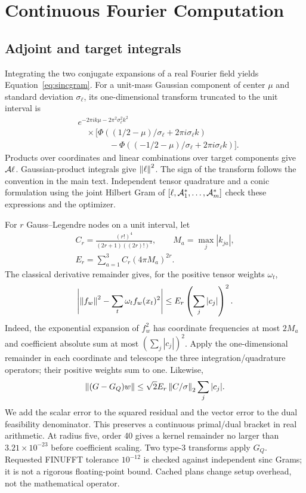 \section{Continuous Fourier Computation}\label{app:continuous}
\subsection{Adjoint and target integrals}
Integrating the two conjugate expansions of a real Fourier field yields
Equation~\eqref{eq:sincgram}. For a unit-mass Gaussian component of center
$\mu$ and standard deviation $\sigma_\ell$, its one-dimensional transform
truncated to the unit interval is
\begin{align}
&e^{-2\pi i k\mu-2\pi^2\sigma_\ell^2k^2}\nonumber\\
&\quad\times[\Phi((1/2-\mu)/\sigma_\ell+2\pi i\sigma_\ell k)\nonumber\\
&\hspace{45pt}-\Phi((-1/2-\mu)/\sigma_\ell+2\pi i\sigma_\ell k)].
\end{align}
Products over coordinates and linear combinations over target components
give $\mathcal A\ell$. Gaussian-product integrals give $\left\|\ell\right\|^2$. The sign
of the transform follows the convention in the main text. Independent
tensor quadrature and a conic formulation using the joint Hilbert Gram of
$[\ell,\mathcal A_1^*,\ldots,\mathcal A_m^*]$ check these expressions and the optimizer.

For $r$ Gauss--Legendre nodes on a unit interval, let
\[
\begin{gathered}
C_r=\frac{(r!)^4}{(2r+1)((2r)!)^3},\qquad M_a=\max_j|k_{ja}|,\\
E_r=\sum_{a=1}^3 C_r(4\pi M_a)^{2r}.
\end{gathered}
\]
The classical derivative remainder \citep{dlmfquadrature} gives, for the
positive tensor weights $\omega_t$,
\begin{equation}
\left|\left\|f_w\right\|^2-\sum_t\omega_t f_w(x_t)^2\right|
\le E_r\left(\sum_j|c_j|\right)^2.
\end{equation}
Indeed, the exponential expansion of $f_w^2$ has coordinate frequencies at
most $2M_a$ and coefficient absolute sum at most $(\sum_j|c_j|)^2$.
Apply the one-dimensional remainder in each coordinate and telescope the
three integration/quadrature operators; their positive weights sum to one.
Likewise,
\begin{equation}
\left\|(G-G_Q)w\right\|\le\sqrt2 E_r\left\|C/\sigma\right\|_2\sum_j|c_j|.
\end{equation}
We add the scalar error to the squared residual and the vector error to the
dual feasibility denominator. This preserves a continuous primal/dual
bracket in real arithmetic. At radius five, order 40 gives a kernel
remainder no larger than $3.21\times10^{-23}$ before coefficient scaling.
Two type-3 transforms apply $G_Q$. Requested FINUFFT tolerance $10^{-12}$ is
checked against independent sinc Grams; it is not a rigorous floating-point
bound. Cached plans change setup overhead, not the mathematical operator.

